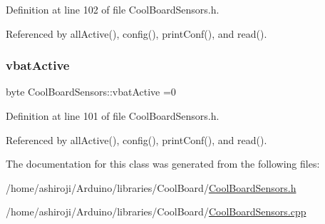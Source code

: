 Definition at line 102 of file Cool\+Board\+Sensors.\+h.



Referenced by all\+Active(), config(), print\+Conf(), and read().

\mbox{\label{classCoolBoardSensors_af5039ad760b0ff0aa7eee16c55e81702}} 
\subsubsection{\texorpdfstring{vbat\+Active}{vbatActive}}
{\footnotesize\ttfamily byte Cool\+Board\+Sensors\+::vbat\+Active =0\hspace{0.3cm}{\ttfamily [private]}}



Definition at line 101 of file Cool\+Board\+Sensors.\+h.



Referenced by all\+Active(), config(), print\+Conf(), and read().



The documentation for this class was generated from the following files\+:\begin{DoxyCompactItemize}
\item 
/home/ashiroji/\+Arduino/libraries/\+Cool\+Board/\hyperlink{CoolBoardSensors_8h}{Cool\+Board\+Sensors.\+h}\item 
/home/ashiroji/\+Arduino/libraries/\+Cool\+Board/\hyperlink{CoolBoardSensors_8cpp}{Cool\+Board\+Sensors.\+cpp}\end{DoxyCompactItemize}
